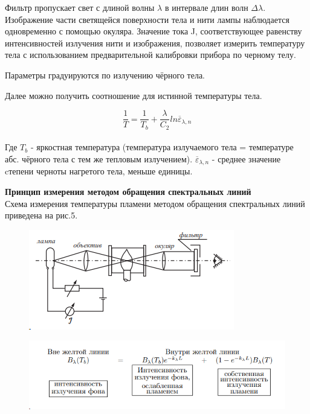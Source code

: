 \documentclass[12pt,a4paper]{article}
\begin{document}
	Фильтр пропускает свет с длиной волны $\lambda$ в интервале длин волн $\Delta$$\lambda$. Изображение части светящейся поверхности тела и нити лампы наблюдается одновременно с помощью окуляра. Значение тока J, соответствующее равенству интенсивностей излучения нити и изображения, позволяет измерить температуру тела с использованием предварительной калибровки прибора по черному телу.
	
	Параметры градуируются по излучению чёрного тела. 
	
	Далее можно получить соотношение для истинной температуры тела.
	
	\begin{equation}
		\frac{1}{T} = \frac{1}{T_b} + \frac{\lambda}{C_2} ln\overline{\varepsilon}_{\lambda, n}
	\end{equation}\\

	Где $T_b$ - яркостная температура (температура излучаемого тела = температуре абс. чёрного тела с тем же тепловым излучением). $\overline{\varepsilon}_{\lambda, n}$ - среднее значение cтепени черноты нагретого тела, меньше единицы. 
	
	
	
	
	\textbf{Принцип измерения методом обращения спектральных линий}\\
	Схема измерения температуры пламени методом обращения спектральных линий приведена на рис.5.
	
	\begin{figure}[H]
		\centering
		\includegraphics[scale=1.2]{5}
		\caption{}
		\label{fig:5}
	\end{figure}
	
	\begin{figure}[H]
		\centering
		\includegraphics[scale=1]{6}
		\caption{}
		\label{fig:6}
	\end{figure}
	
\end{document}
